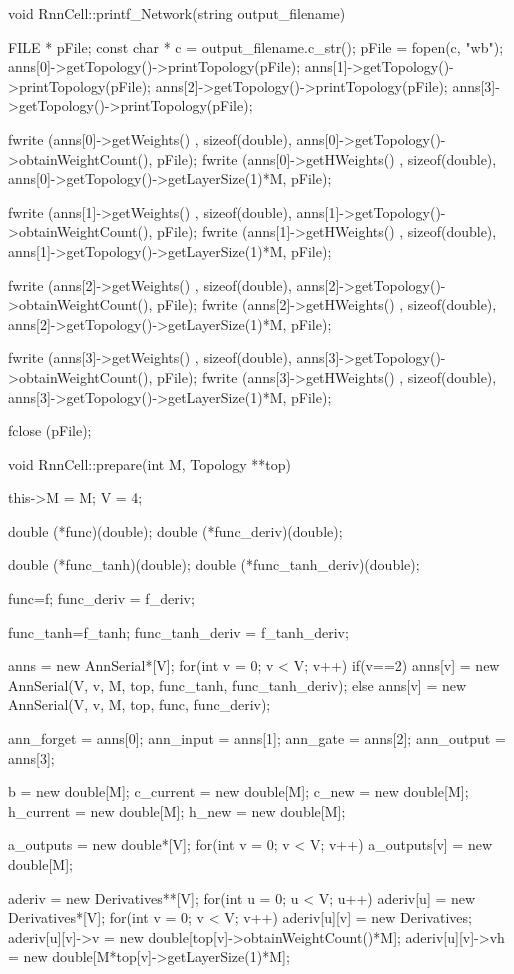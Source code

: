 void RnnCell::printf_Network(string output_filename){

    FILE * pFile;
    const char * c = output_filename.c_str();
    pFile = fopen(c, "wb");
    anns[0]->getTopology()->printTopology(pFile);
    anns[1]->getTopology()->printTopology(pFile);
    anns[2]->getTopology()->printTopology(pFile);
    anns[3]->getTopology()->printTopology(pFile);

    fwrite (anns[0]->getWeights() , sizeof(double), anns[0]->getTopology()->obtainWeightCount(), pFile);
    fwrite (anns[0]->getHWeights() , sizeof(double), anns[0]->getTopology()->getLayerSize(1)*M, pFile);

    fwrite (anns[1]->getWeights() , sizeof(double), anns[1]->getTopology()->obtainWeightCount(), pFile);
    fwrite (anns[1]->getHWeights() , sizeof(double), anns[1]->getTopology()->getLayerSize(1)*M, pFile);

    fwrite (anns[2]->getWeights() , sizeof(double), anns[2]->getTopology()->obtainWeightCount(), pFile);
    fwrite (anns[2]->getHWeights() , sizeof(double), anns[2]->getTopology()->getLayerSize(1)*M, pFile);

    fwrite (anns[3]->getWeights() , sizeof(double), anns[3]->getTopology()->obtainWeightCount(), pFile);
    fwrite (anns[3]->getHWeights() , sizeof(double), anns[3]->getTopology()->getLayerSize(1)*M, pFile);

    fclose (pFile);
}

void RnnCell::prepare(int M, Topology **top){
  this->M = M;
  V = 4;

  double (*func)(double);
  double (*func_deriv)(double);

  double (*func_tanh)(double);
  double (*func_tanh_deriv)(double);

  func=f;
  func_deriv = f_deriv;

  func_tanh=f_tanh;
  func_tanh_deriv = f_tanh_deriv;


  anns = new AnnSerial*[V];
  for(int v = 0; v < V; v++){
    if(v==2){
      anns[v] = new AnnSerial(V, v, M, top, func_tanh, func_tanh_deriv);
    } else {
      anns[v] = new AnnSerial(V, v, M, top, func, func_deriv);
    }
  }

  ann_forget = anns[0];
  ann_input = anns[1];
  ann_gate = anns[2];
  ann_output = anns[3];




  b = new double[M];
  c_current = new double[M];
  c_new = new double[M];
  h_current = new double[M];
  h_new = new double[M];

  a_outputs = new double*[V];
  for(int v = 0; v < V; v++){
    a_outputs[v] = new double[M];
  }

  aderiv = new Derivatives**[V];
  for(int u = 0; u < V; u++){
    aderiv[u] = new Derivatives*[V];
    for(int v = 0; v < V; v++){
      aderiv[u][v] = new Derivatives;
      aderiv[u][v]->v = new double[top[v]->obtainWeightCount()*M];
      aderiv[u][v]->vh = new double[M*top[v]->getLayerSize(1)*M];
    }
  }
}


